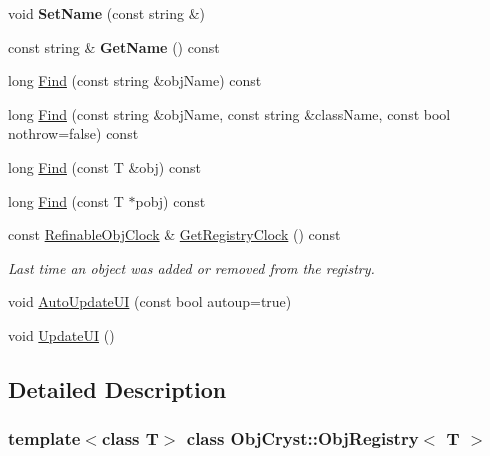 \begin{DoxyCompactItemize}
\mbox{\label{class_obj_cryst_1_1_obj_registry_a91258ba46872ec4bd6ad61499db42f11}} 
void {\bfseries Set\+Name} (const string \&)
\item 
\mbox{\label{class_obj_cryst_1_1_obj_registry_a9ca22a958f30fe65c8106c6aa6c5d563}} 
const string \& {\bfseries Get\+Name} () const
\item 
long \mbox{\hyperlink{class_obj_cryst_1_1_obj_registry_a712fede2be32673dcd92b7f2fb1779d6}{Find}} (const string \&obj\+Name) const
\item 
long \mbox{\hyperlink{class_obj_cryst_1_1_obj_registry_a84c4ae3459936ac2f8f9c87f7bb95923}{Find}} (const string \&obj\+Name, const string \&class\+Name, const bool nothrow=false) const
\item 
long \mbox{\hyperlink{class_obj_cryst_1_1_obj_registry_ac6755dd7352567c2da151276f81d346d}{Find}} (const T \&obj) const
\item 
long \mbox{\hyperlink{class_obj_cryst_1_1_obj_registry_af50ff94a6fe0ea811d330649914a6d05}{Find}} (const T $\ast$pobj) const
\item 
\mbox{\label{class_obj_cryst_1_1_obj_registry_afc36eb9d06bdc9df010c3333ebd17ab8}} 
const \mbox{\hyperlink{class_obj_cryst_1_1_refinable_obj_clock}{Refinable\+Obj\+Clock}} \& \mbox{\hyperlink{class_obj_cryst_1_1_obj_registry_afc36eb9d06bdc9df010c3333ebd17ab8}{Get\+Registry\+Clock}} () const
\begin{DoxyCompactList}\small\item\em Last time an object was added or removed from the registry. \end{DoxyCompactList}\item 
void \mbox{\hyperlink{class_obj_cryst_1_1_obj_registry_a161b9a23fa38db7748a2202cc691b81c}{Auto\+Update\+UI}} (const bool autoup=true)
\item 
void \mbox{\hyperlink{class_obj_cryst_1_1_obj_registry_adac90a90cdee6d27cd5d9af917a86ab6}{Update\+UI}} ()
\end{DoxyCompactItemize}


\subsection{Detailed Description}
\subsubsection*{template$<$class T$>$\newline
class Obj\+Cryst\+::\+Obj\+Registry$<$ T $>$}

